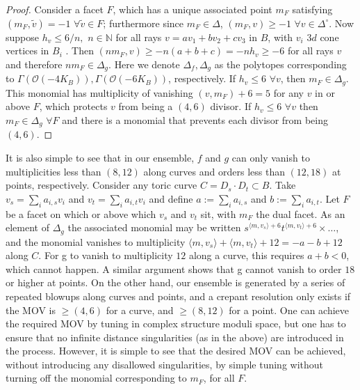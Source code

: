 \documentclass[aps,prl,twocolumn, superscriptaddress,groupedaddress,nofootinbib]{revtex4-1}
\newcommand{\vev}[1]{\langle #1 \rangle}
\begin{document}
\begin{proof}
Consider a facet
$F$, which has a unique associated point $m_F$ satisfying
$(m_F,\tilde v)=-1 \,\, \forall \tilde v \in F$; furthermore
since $m_F\in\Delta$, 
$(m_F,v)\geq -1\,\, \forall v\in\Delta^\circ$. Now
suppose $h_v \leq 6/n, \,\, n \in \mathbb{N}$  
for all rays $v=av_1 + b v_2 + c v_3$
in $B$, with $v_i$ $3d$ cone vertices in $B_i$ . Then 
$(nm_F, v)\geq -n(a+b+c)=-nh_v\geq -6$ for all rays $v$ and
therefore $nm_F \in \Delta_g$. {\color{red}Here we denote $\Delta_{f},\Delta_{g}$ as the polytopes corresponding to $\Gamma (\mathcal{O}(-4 K_B)),\Gamma (\mathcal{O}(-6 K_B))$, respectively.} If $h_v\leq 6\,\, \forall v$, then $m_F\in\Delta_g$. This monomial has multiplicity of vanishing
$(v,m_F)+6=5$ for any $v$ in or above $F$, which protects
$v$ from being a $(4,6)$ divisor. If
$h_v\leq 6 \,\, \forall v$ then $m_F \in \Delta_g\,\, \forall F$
and there is a monomial that prevents
each divisor from being $(4,6)$.
\end{proof}

It is also simple to see that in our ensemble, $f$ and $g$ can only vanish to multiplicities less than $(8,12)$ along curves and orders less than $(12,18)$ at points, respectively. Consider any toric curve $C=D_s\cdot D_t \subset B$. Take $v_s=\sum_i a_{i,s} v_i$ and $v_t=\sum_i a_{i,t} v_i$ and define $a:=\sum_i a_{i,s}$ and $b:=\sum_i a_{i,t}$. Let $F$ be a facet
on which or above which $v_s$ and $v_t$ sit, with $m_F$ the dual facet. As an
element of $\Delta_g$ the associated monomial may be written
$s^{\vev{m,v_s}+6}t^{\vev{m,v_t}+6}\times \dots$,
and the monomial vanishes to multiplicity $\vev{m,v_s}+\vev{m,v_t}+12=-a-b+12$ along $C$. For g to vanish to multiplicity $12$ along a curve, this requires $a+ b <0$, which cannot happen. A similar argument shows that g cannot vanish to order $18$ or higher at points.
On the other hand, our ensemble is generated by a series of repeated blowups along curves and points, and a crepant resolution only exists if the MOV is $\geq (4,6)$ for a curve, and $\geq (8,12)$  for a point. One can achieve the required MOV by tuning in complex structure moduli space, but one has to ensure that no infinite distance singularities (as in the above) are introduced in the process. However, it is simple to see that the desired MOV can be achieved, without introducing any disallowed singularities, by simple tuning without turning off the monomial corresponding to $m_F$, for all $F$. 
\end{document}
